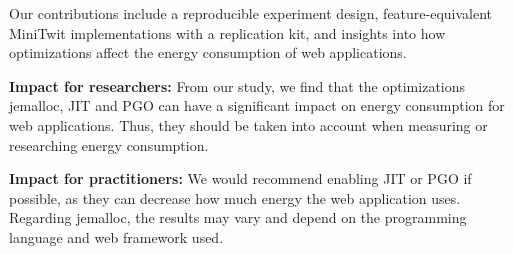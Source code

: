 \documentclass[main.tex]{subfiles}
\begin{document}
Our contributions include a reproducible experiment design, feature-equivalent MiniTwit implementations with a replication kit, and insights into how optimizations affect the energy consumption of web applications.


\textbf{Impact for researchers:} From our study, we find that the optimizations jemalloc, JIT and PGO can have a significant impact on energy consumption for web applications. Thus, they should be taken into account when measuring or researching energy consumption. 

\textbf{Impact for practitioners:} We would recommend enabling JIT or PGO if possible, as they can decrease how much energy the web application uses. Regarding jemalloc, the results may vary and depend on the programming language and web framework used.
\end{document}
